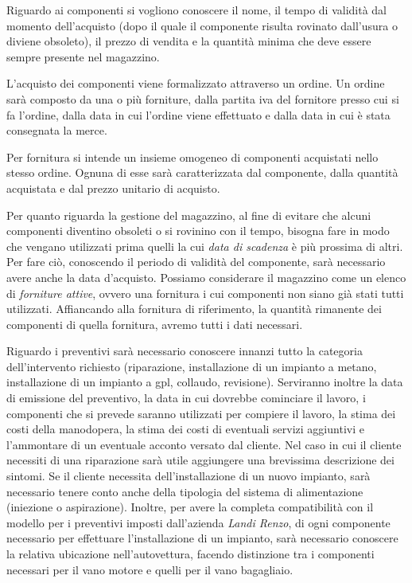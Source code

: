 		Riguardo ai componenti si vogliono conoscere il nome, il tempo di validità dal momento dell'acquisto (dopo il quale il componente risulta rovinato dall'usura o diviene obsoleto), il prezzo di vendita e la quantità minima che deve essere sempre presente nel magazzino.
		
		L'acquisto dei componenti viene formalizzato attraverso un ordine. Un ordine sarà composto da una o più forniture, dalla partita iva del fornitore presso cui si fa l'ordine, dalla data in cui l'ordine viene effettuato e dalla data in cui è stata consegnata la merce.
		
		Per fornitura si intende un insieme omogeneo di componenti acquistati nello stesso ordine. Ognuna di esse sarà caratterizzata dal componente, dalla quantità acquistata e dal prezzo unitario di acquisto.
		
		Per quanto riguarda la gestione del magazzino, al fine di evitare che alcuni componenti diventino obsoleti o si rovinino con il tempo, bisogna fare in modo che vengano utilizzati prima quelli la cui \emph{data di scadenza} è più prossima di altri. Per fare ciò, conoscendo il periodo di validità del componente, sarà necessario avere anche la data d'acquisto.
		Possiamo considerare il magazzino come un elenco di \emph{forniture attive}, ovvero una fornitura i cui componenti non siano già stati tutti utilizzati. Affiancando alla fornitura di riferimento, la quantità rimanente dei componenti di quella fornitura, avremo tutti i dati necessari.
		
		Riguardo i preventivi sarà necessario conoscere innanzi tutto la categoria dell'intervento richiesto (riparazione, installazione di un impianto a metano, installazione di un impianto a gpl, collaudo, revisione). Serviranno inoltre la data di emissione del preventivo, la data in cui dovrebbe cominciare il lavoro, i componenti che si prevede saranno utilizzati per compiere il lavoro, la stima dei costi della manodopera, la stima dei costi di eventuali servizi aggiuntivi e l'ammontare di un eventuale acconto versato dal cliente.
		Nel caso in cui il cliente necessiti di una riparazione sarà utile aggiungere una brevissima descrizione dei sintomi.
		Se il cliente necessita dell’installazione di un nuovo impianto, sarà necessario tenere conto anche della tipologia del sistema di alimentazione (iniezione o aspirazione). Inoltre, per avere la completa compatibilità con il modello per i preventivi imposti dall'azienda \emph{Landi Renzo}, di ogni componente necessario per effettuare l'installazione di un impianto, sarà necessario conoscere la relativa ubicazione nell'autovettura, facendo distinzione tra i componenti necessari per il vano motore e quelli per il vano bagagliaio.
		
